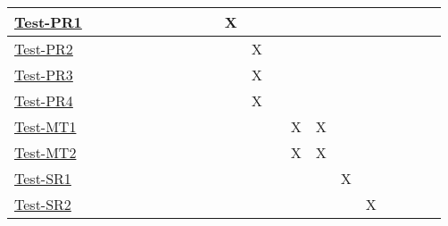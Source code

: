 \documentclass[12pt, titlepage]{article}
\begin{document}
\begin{landscape}
\begin{table}[H]
\begin{adjustwidth}{-0.3in}{-0.5in}
{\begin{tabular}{c|c|c|c|c|c|c|c|c|c|c|c|c|c|c|c|c|c|c|c|c|}
\multicolumn{1}{|l|}{\hyperref[itm:Test-PR1]{Test-PR1}}   &             &             &             &             &             &             &             &                           &              &      X        &              &             &             &             &       & &&&&      \\ \hline
\multicolumn{1}{|l|}{\hyperref[itm:Test-PR2]{Test-PR2}}   &             &             &             &             &             &             &             &                          &             &             &    X         &              &              &            &      &   &&&&     \\ \hline
\multicolumn{1}{|l|}{\hyperref[itm:Test-PR3]{Test-PR3}}   &             &             &             &             &             &             &            &                           &              &              &      X        &             &             &             &     &   &&&&      \\ \hline
\multicolumn{1}{|l|}{\hyperref[itm:Test-PR4]{Test-PR4}}   &             &             &             &             &             &              &            &                           &              &              &      X        &             &             &             &     &   &&&&      \\ \hline
\multicolumn{1}{|l|}{\hyperref[itm:Test-MT1]{Test-MT1}}   &             &             &             &             &             &              &             &                           &              &              &             &              &      X       &      X      &         &&&&&     \\ \hline
\multicolumn{1}{|l|}{\hyperref[itm:Test-MT2]{Test-MT2}}   &                          &             &             &             &              &             &             &              &              &              &             &              &       X      &       X      &         &&&&&     \\ \hline
\multicolumn{1}{|l|}{\hyperref[itm:Test-SR1]{Test-SR1}}   &                          &             &             &             &              &             &             &              &              &              &             &              &             &             &    X     &&&&&     \\ \hline
\multicolumn{1}{|l|}{\hyperref[itm:Test-SR2]{Test-SR2}}   &             &             &             &             &             &              &             &             &              &              &              &             &              &             &             &         X&&&&     \\ \hline

\end{tabular}}
\end{adjustwidth}
\end{table}
\end{landscape}
\end{document}
